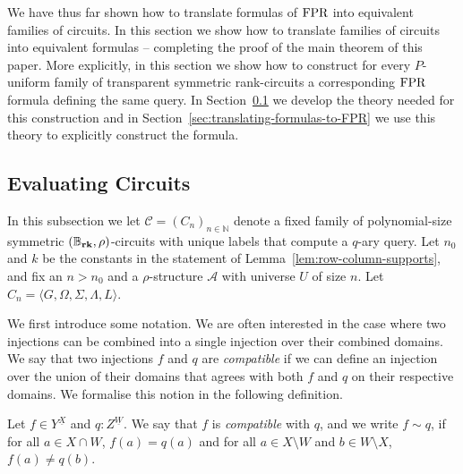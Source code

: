 \documentclass[../paper.tex]{subfiles}
\begin{document}
We have thus far shown how to translate formulas of $\text{\upshape FPR}$ into equivalent
families of circuits. In this section we show how to translate families of
circuits into equivalent formulas -- completing the proof of the main theorem of
this paper. More explicitly, in this section we show how to construct for every
$P$-uniform family of transparent symmetric rank-circuits a corresponding $\text{\upshape FPR}$
formula defining the same query. In Section~\ref{sec:evaluating-circuits} we develop the theory
needed for this construction and in Section~\ref{sec:translating-formulas-to-FPR} we use this theory to explicitly construct
the formula.


\subsection {Evaluating Circuits}\label{sec:evaluating-circuits}
In this subsection we let $\mathcal{C} = (C_n)_{n \in \mathbb{N}}$ denote a
fixed family of polynomial-size symmetric $(\mathbb{B}_{\text{\textbf{rk}}},\rho)$-circuits with unique
labels that compute a $q$-ary query. Let $n_0$ and $k$ be the constants in the
statement of Lemma~\ref{lem:row-column-supports}, and fix an $n > n_0$ and a
$\rho$-structure $\mathcal{A}$ with universe $U$ of size $n$. Let $C_n = \langle
G, \Omega, \Sigma, \Lambda, L \rangle$.

We first introduce some notation.  We are often interested in the case where two injections can be combined into a
single injection over their combined domains. We say that two
injections  $f$ and $q$ are \emph{compatible} if we can define an injection over the union of
their domains that agrees with both $f$ and $q$ on their respective domains. We
formalise this notion in the following definition.

\begin{definition}
	Let $f \in Y^{\underline{X}}$ and $q : Z^{\underline{W}}$. We say that $f$ is
  \emph{compatible} with $q$, and we write $f \sim q$, if for all $a \in X \cap
  W$, $f(a) = q(a)$ and for all $a \in X \setminus W$ and $b \in W \setminus X$,
  $f(a) \neq q(b)$.
\end{definition}
\end{document}
